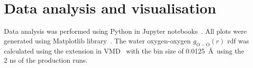 











\section{Data analysis and visualisation}
Data analysis was performed using Python in Jupyter notebooks~\citep{grangerJupyterThinkingStorytelling2021}. All plots were generated using Matplotlib library~\citep{hunterMatplotlib2DGraphics2007}. The water oxygen-oxygen $g_\mathrm{O-O}(r)$ \ac{rdf} was calculated using the extension in VMD~\citep{humphreyVMDVisualMolecular1996} with the bin size of 0.0125~\AA\ using the 2 ns of the production runs.
